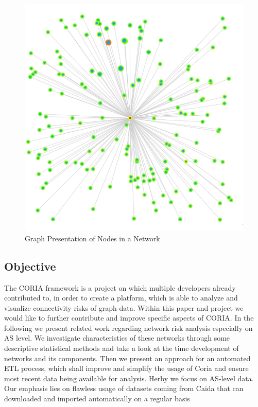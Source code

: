 \documentclass[conference]{IEEEtran}
\begin{document}
\begin{figure}[htbp]
\centerline{\includegraphics[scale=0.2]{Graphics/nodePresentaion.PNG}}
\caption{Graph Presentation of Nodes in a Network}
\label{fig}
\end{figure}



\subsection{Objective}
The CORIA framework is a project on which multiple developers already contributed to, in order to create a platform, which is able to analyze and visualize connectivity risks of graph data. Within this paper and project we would like to further contribute and improve specific aspects of CORIA. In the following we present related work regarding network risk analysis especially on AS level. We investigate characteristics of these networks through some descriptive statistical methods and take a look at the time development of networks and its components. Then we present an approach for an automated ETL process, which shall improve and simplify the usage of Coria and ensure most recent data being available for analysis. Herby we focus on AS-level data. Our emphasis lies on flawless usage of datasets coming from Caida that can downloaded and imported automatically on a regular basis \\
\end{document}
